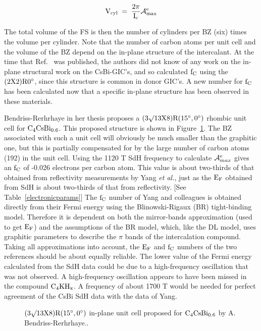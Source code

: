 \[ \rm V_{cyl} \; = \; \frac{2 \pi}{I_c} {\cal A}_{max}^e
\]

\noindent  The total volume of the FS is then the number  of cylinders per
BZ  (six) times the  volume per cylinder.  Note  that the number  of carbon
atoms  per unit cell and the  volume  of   the  BZ  depend  on the in-plane
structure of  the  intercalant.  At  the   time that Ref.~\cite{E291}   was
published, the authors did not know of any work  on the in-plane structural
work on   the  CsBi-GIC's, and   so calculated $\rm    f_C$ using  the $\rm
(2X2)R0^{\circ}$, since this structure is common  in donor GIC's.\cite{I94}
A new number for $\rm f_C$ has been calculated now that a specific in-plane
structure has been observed in these materials.

	Bendriss-Rerhrhaye in her  thesis  proposes  a  $\rm  (3\surd13   X
8)R(15^{\circ},0^{\circ})$   rhombic       unit     cell     for       $\rm
C_4CsBi_{0.6}$.\cite{bendriss86}  This   proposed   structure  is shown  in
Figure~\ref{csbistruct}.   The  BZ  associated  with such a unit  cell will
obviously be  much smaller  than the graphitic  one, but this  is partially
compensated for by the large number of carbon atoms (192) in the unit cell.
Using  the 1120 T  SdH frequency  to calculate ${\cal  A}_{max}^e$ gives an
$\rm  f_C$   of -0.026 electrons per  carbon   atom.  This value  is  about
two-thirds of that obtained from  reflectivity measurements by Yang {\em et
al.}\cite{yang88},   just as the $\rm    E_F$ obtained from   SdH is  about
two-thirds of  that  from reflectivity.  [See Table~\ref{electronicparams}]
The $\rm f_C$ number of Yang and colleagues is obtained directly from their
Fermi     energy     using   the   Blinowski-Rigaux    (BR)   tight-binding
model.\cite{blinowski80} Therefore it is dependent on both the mirror-bands
approximation (used to get $\rm E_F$) and the assumptions of  the BR model,
which, like the DL model, uses graphitic  parameters  to describe the $\pi$
bands of the   intercalation compound.    Taking  all  approximations  into
account, the $\rm E_F$ and $\rm f_C$  numbers of  the two references should
be about equally reliable.  The lower value  of the Fermi energy calculated
from the SdH data could be due to a high-frequency oscillation that was not
observed.  A high-frequency oscillation appears to  have been missed in the
compound $\rm  C_4KH_x$.\cite{doll87} A frequency  of about 1700 T would be
needed for perfect agreement of the CsBi SdH data with the data of Yang.

\begin{figure}
\center
{} 
\caption[Proposed structure of $\rm C_4CsBi_{0.6}$]{$\rm  (3\surd13 X 8)R(15^{\circ},0^{\circ})$ in-plane unit cell
proposed for $\rm C_4CsBi_{0.6}$ by A. Bendriss-Rerhrhaye.\cite{bendriss86}.}
\label{csbistruct}
\end{figure}

